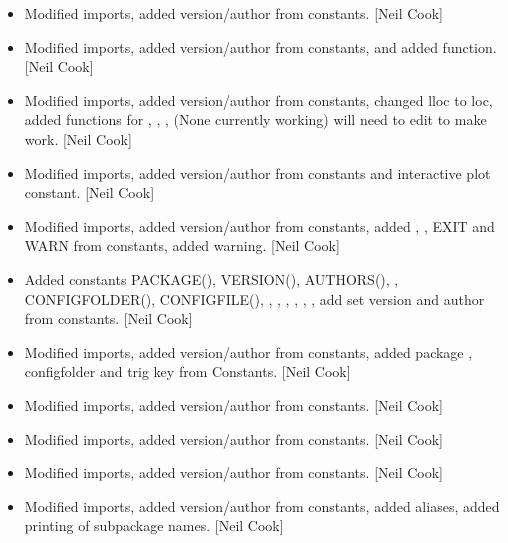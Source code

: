 \documentclass[a4paper,10pt,english]{report}
\begin{document}
\begin{itemize}
\item {} 
Modified imports, added version/author from constants. {[}Neil Cook{]}

\item {} 
Modified imports, added version/author from constants, and added
 function. {[}Neil Cook{]}

\item {} 
Modified imports, added version/author from constants, changed lloc to
loc, added functions for , ,
,  (None currently working) \sphinxhyphen{}
will need to edit  to make work. {[}Neil Cook{]}

\item {} 
Modified imports, added version/author from constants and interactive
plot constant. {[}Neil Cook{]}

\item {} 
Modified imports, added version/author from constants, added ,
, EXIT and WARN from constants, added 
warning. {[}Neil Cook{]}

\item {} 
Added constants PACKAGE(), VERSION(), AUTHORS(), ,
CONFIGFOLDER(), CONFIGFILE(), ,
, , ,
, , add set version and author
from constants. {[}Neil Cook{]}

\item {} 
Modified imports, added version/author from constants, added package
, configfolder and trig key from Constants. {[}Neil Cook{]}

\item {} 
Modified imports, added version/author from constants. {[}Neil Cook{]}

\item {} 
Modified imports, added version/author from constants. {[}Neil Cook{]}

\item {} 
Modified imports, added version/author from constants. {[}Neil Cook{]}

\item {} 
Modified imports, added version/author from constants, added 
aliases, added printing of sub\sphinxhyphen{}package names. {[}Neil Cook{]}


\end{itemize}
\end{document}
